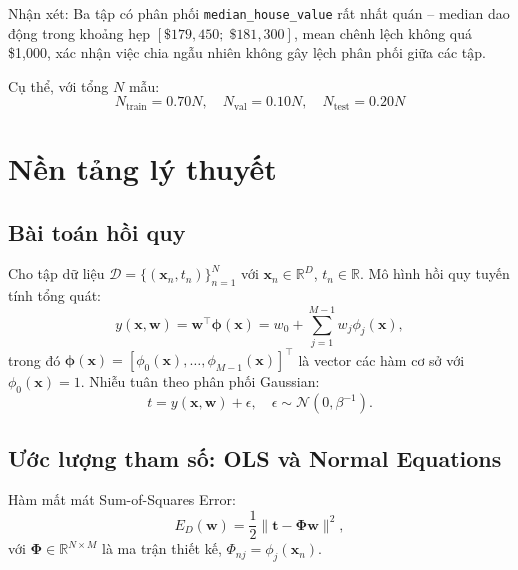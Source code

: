 \documentclass[12pt,a4paper]{article}
\begin{document}
Nhận xét: Ba tập có phân phối \texttt{median\_house\_value} rất nhất
quán -- median dao động trong khoảng hẹp
$[\$179{,}450;\; \$181{,}300]$, mean chênh lệch không quá \$1{,}000,
xác nhận việc chia ngẫu nhiên không gây lệch phân phối giữa các tập.

Cụ thể, với tổng $N$ mẫu:
$$N_{\text{train}} = 0.70N, \quad N_{\text{val}} = 0.10N, \quad N_{\text{test}} = 0.20N$$

\section{Nền tảng lý thuyết}
\label{sec:theory}

\subsection{Bài toán hồi quy}

Cho tập dữ liệu $\mathcal{D} = \{(\mathbf{x}_n, t_n)\}_{n=1}^{N}$ với
$\mathbf{x}_n \in \mathbb{R}^D$, $t_n \in \mathbb{R}$. Mô hình hồi quy tuyến tính
tổng quát:
\begin{equation}
  y(\mathbf{x}, \mathbf{w}) = \mathbf{w}^\top \boldsymbol{\phi}(\mathbf{x})
  = w_0 + \sum_{j=1}^{M-1} w_j \phi_j(\mathbf{x}),
  \label{eq:linear_model}
\end{equation}
trong đó $\boldsymbol{\phi}(\mathbf{x}) = [\phi_0(\mathbf{x}), \dots, \phi_{M-1}(\mathbf{x})]^\top$
là vector các hàm cơ sở với $\phi_0(\mathbf{x}) = 1$. Nhiễu tuân theo phân phối Gaussian:
\begin{equation}
  t = y(\mathbf{x}, \mathbf{w}) + \epsilon, \quad \epsilon \sim \mathcal{N}(0, \beta^{-1}).
  \label{eq:noise_model}
\end{equation}

\subsection{Ước lượng tham số: OLS và Normal Equations}

Hàm mất mát Sum-of-Squares Error:
\begin{equation}
  E_D(\mathbf{w}) = \frac{1}{2}\|\mathbf{t} - \boldsymbol{\Phi}\mathbf{w}\|^2,
  \label{eq:ols_loss}
\end{equation}
với $\boldsymbol{\Phi} \in \mathbb{R}^{N \times M}$ là ma trận thiết kế, $\Phi_{nj} = \phi_j(\mathbf{x}_n)$.
\end{document}
